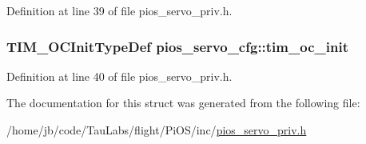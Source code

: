 \-Definition at line 39 of file pios\-\_\-servo\-\_\-priv.\-h.

\hypertarget{structpios__servo__cfg_ac1b8636b07f30c4a459b1c09eec6356a}{
\subsubsection[{tim\-\_\-oc\-\_\-init}]{\setlength{\rightskip}{0pt plus 5cm}\-T\-I\-M\-\_\-\-O\-C\-Init\-Type\-Def {\bf pios\-\_\-servo\-\_\-cfg\-::tim\-\_\-oc\-\_\-init}}}\label{structpios__servo__cfg_ac1b8636b07f30c4a459b1c09eec6356a}


\-Definition at line 40 of file pios\-\_\-servo\-\_\-priv.\-h.



\-The documentation for this struct was generated from the following file\-:\begin{DoxyCompactItemize}
\item 
/home/jb/code/\-Tau\-Labs/flight/\-Pi\-O\-S/inc/\hyperlink{pios__servo__priv_8h}{pios\-\_\-servo\-\_\-priv.\-h}\end{DoxyCompactItemize}
